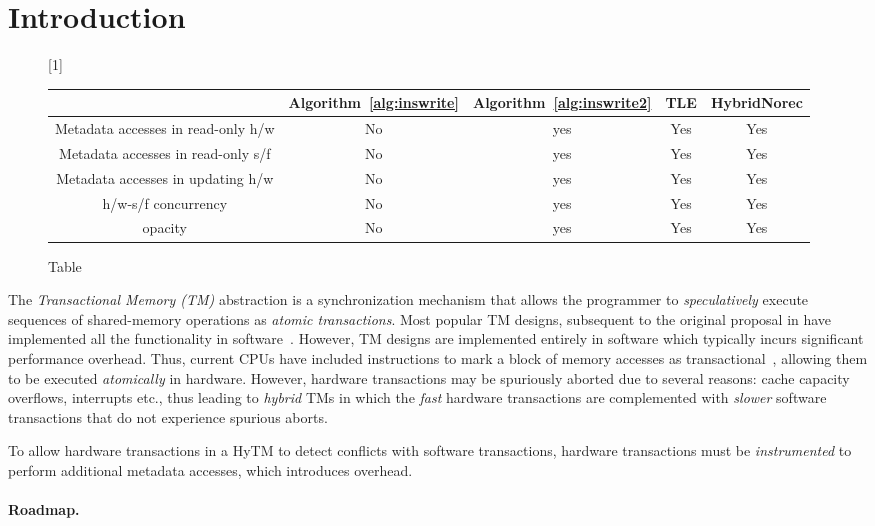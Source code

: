 \section{Introduction}
\label{sec:intro}
%
\begin{figure*}[!ht]
      
     \scalebox{1}[1]{
     \begin{tabularx}{\textwidth}{c|c|c|c|c}
	~~~~~ & Algorithm~\ref{alg:inswrite} & Algorithm~\ref{alg:inswrite2} & TLE & HybridNorec\\ \hline
	Metadata accesses in read-only h/w & No & yes & Yes & Yes \\ \hline
	Metadata accesses in read-only s/f & No & yes & Yes & Yes \\ \hline
	Metadata accesses in updating h/w & No & yes & Yes & Yes \\ \hline
	h/w-s/f concurrency & No & yes & Yes & Yes \\ \hline
	opacity & No & yes & Yes & Yes \\  \hline
   \end{tabularx}
\caption{Table}\label{fig:main}    
}
\end{figure*}
%
The \emph{Transactional Memory (TM)} abstraction is a synchronization mechanism 
that allows the programmer to \emph{speculatively} execute sequences of shared-memory
operations as \emph{atomic transactions}.
Most popular TM designs, subsequent to the original proposal in \cite{HM93} 
have implemented all the functionality in software~\cite{norec, ST95,HLM+03, astm, fraser}.
However, TM designs are implemented entirely in software which typically incurs significant performance overhead.
Thus, current CPUs have included instructions to mark a block of memory accesses as transactional~\cite{Rei12, asf, bluegene}, allowing them to be executed \emph{atomically} in hardware.
However, hardware transactions may be spuriously aborted due to several reasons: cache capacity overflows, interrupts etc., thus leading to \emph{hybrid} TMs 
in which the \emph{fast} hardware transactions are complemented with \emph{slower} software transactions that do not experience spurious aborts.

To allow hardware transactions in a HyTM to detect conflicts with software transactions, 
hardware transactions must be \emph{instrumented} to perform additional metadata accesses, which introduces overhead.

\paragraph{Roadmap.}